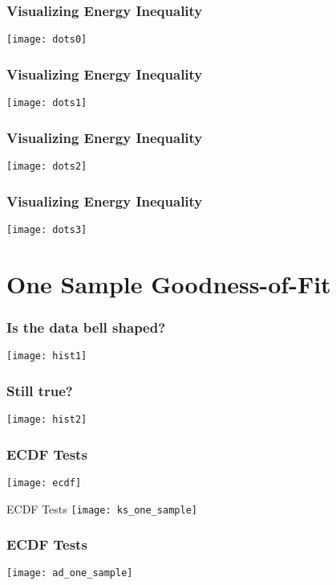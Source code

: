 \documentclass[presentation]{beamer}
\begin{document}
\begin{frame}
  \frametitle{Visualizing Energy Inequality}
  \begin{center}
    \texttt{[image: dots0]}
  \end{center}
\end{frame}

\begin{frame}
  \frametitle{Visualizing Energy Inequality}
  \begin{center}
    \texttt{[image: dots1]}
  \end{center}
\end{frame}


\begin{frame}
  \frametitle{Visualizing Energy Inequality}
  \begin{center}
    \texttt{[image: dots2]}
  \end{center}
\end{frame}


\begin{frame}
  \frametitle{Visualizing Energy Inequality}
  \begin{center}
    \texttt{[image: dots3]}
  \end{center}
\end{frame}


\section{One Sample Goodness-of-Fit}

\begin{frame}
  \frametitle{Is the data bell shaped?}
  \texttt{[image: hist1]}
\end{frame}

\begin{frame}
  \frametitle{Still true?}
  \texttt{[image: hist2]} 
\end{frame}

\begin{frame}
  \frametitle{ECDF Tests}
  \texttt{[image: ecdf]}
\end{frame}

\begin{frame}{ECDF Tests}
  \texttt{[image: ks\_one\_sample]}
\end{frame}

\begin{frame}
  \frametitle{ECDF Tests}
  \texttt{[image: ad\_one\_sample]}  
\end{frame}
\end{document}
